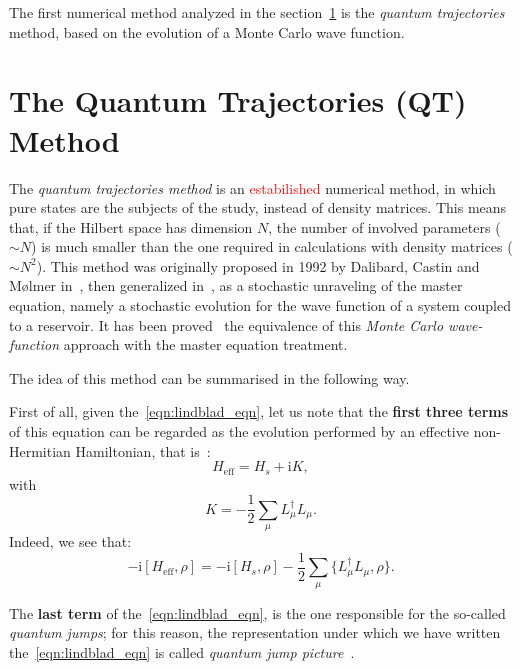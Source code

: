 The first numerical method analyzed in the section~\ref{chapt2_qtm} is the \emph{quantum trajectories} method, based on the evolution of a Monte Carlo wave function.

\section{The Quantum Trajectories (QT) Method}
\label{chapt2_qtm}
The \emph{quantum trajectories method} is an \textcolor{red}{estabilished} numerical method, in which pure states are the subjects of the study, instead of density matrices. This means that, if the Hilbert space has dimension $N$, the number of involved parameters ($\sim N$) is much smaller than the one required in calculations with density matrices ($\sim N^2$). This method was originally proposed in 1992 by Dalibard, Castin and Mølmer in~\cite{PhysRevLett.68.580}, then generalized in~\cite{Molmer:93}, as a stochastic unraveling of the master equation, namely a stochastic evolution for the wave function of a system coupled to a reservoir. It has been proved~\cite{PhysRevLett.68.580, Molmer:93} the equivalence of this \emph{Monte Carlo wave-function} approach with the master equation treatment.

The idea of this method can be summarised in the following way.

First of all, given the~\ref{eqn:lindblad_eqn}, let us note that the \textbf{first three terms} of this equation can be regarded as the evolution performed by an effective non-Hermitian Hamiltonian, that is~\cite{PhysRevA.69.062317}:
\begin{equation*}
    H_{\text{eff}} = H_s + \text{i}K,
\end{equation*}
with
\begin{equation*}
    K = -\frac{1}{2}\sum_\mu L_{\mu}^{\dagger}L_{\mu}.
\end{equation*}
Indeed, we see that:
\begin{equation*}
    -\text{i}[H_\text{eff}, \rho] = -\text{i}[H_s, \rho] - \frac{1}{2}\sum_\mu \{L_{\mu}^{\dagger}L_{\mu}, \rho\}.
\end{equation*}

The \textbf{last term} of the~\ref{eqn:lindblad_eqn}, is the one responsible for the so-called \emph{quantum jumps}; for this reason, the representation under which we have written the~\ref{eqn:lindblad_eqn} is called \emph{quantum jump picture}~\cite{PhysRevA.69.062317}. 

